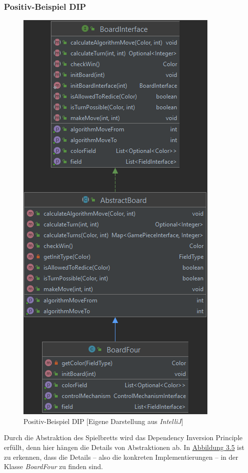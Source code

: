 \subsubsection{Positiv-Beispiel DIP}
\begin{figure}[htbp]
\centering
\centerline{\includegraphics[scale=.45]{positivbeispiel_dip}}
\caption{Positiv-Beispiel DIP [Eigene Darstellung aus \emph{IntelliJ}]}
\label{fig:positivbeispiel_dip}
\end{figure}
\noindent Durch die Abstraktion des Spielbretts wird das Dependency Inversion Principle erfüllt, denn hier hängen die Details von Abstraktionen ab. In \hyperref[fig:positivbeispiel_dip]{Abbildung 3.5} ist zu erkennen, dass die Details -- also die konkreten Implementierungen -- in der Klasse \emph{BoardFour} zu finden sind.

